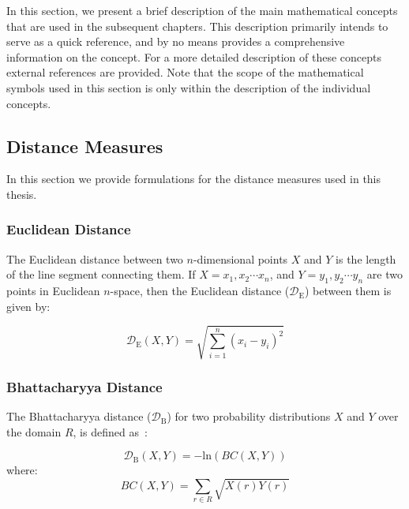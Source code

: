 In this section, we present a brief description of the main mathematical concepts that are used in the subsequent chapters. This description primarily intends to serve as a quick reference, and by no means provides a comprehensive information on the concept. For a more detailed description of these concepts external references are provided. Note that the scope of the mathematical symbols used in this section is only within the description of the individual concepts. 

\subsection{Distance Measures}
\label{sec:distance_measures}

In this section we provide formulations for the distance measures used in this thesis. 

\subsubsection{Euclidean Distance}
\label{sec:euclidean_distance}

The Euclidean distance between two $n$-dimensional points $X$ and $Y$ is the length of the line segment connecting them. If $X=x_1, x_2\cdots x_n$, and $Y=y_1, y_2\cdots y_n$ are two points in Euclidean $n$-space, then the Euclidean distance ($\mathcal{D}_\mathrm{E}$) between them is given by:

\begin{equation}
\label{eq:euclidean_distance}
	\mathcal{D}_\mathrm{E}(X,Y) = \sqrt{\sum_{i=1}^{n}(x_i-y_i)^2}	
\end{equation}

\subsubsection{Bhattacharyya Distance}
\label{sec:bhattacharya_distance}

The Bhattacharyya distance ($\mathcal{D}_\mathrm{B}$) for two probability distributions $X$ and $Y$ over the domain $R$, is defined as~\citep{bhattacharyya1946measure}:

\begin{equation}
\label{eq:bhattacharya_distance}
\mathcal{D}_\mathrm{B}(X,Y) = -\mathrm{ln}(BC(X,Y)) 
\end{equation}
where:
\begin{equation}
BC(X,Y) = \sum_{r \in R} \sqrt{X(r)Y(r)}
\end{equation}


